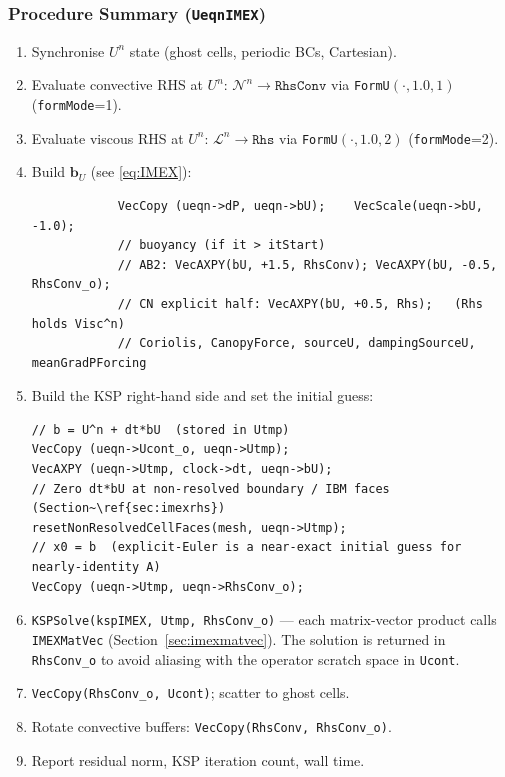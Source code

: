 \documentclass[12pt,a4paper]{article}
\newcommand{\cN}{\mathcal{N}}
\newcommand{\cL}{\mathcal{L}}
\begin{document}
	\subsubsection{Procedure Summary (\texttt{UeqnIMEX})}
	\label{sec:imexproc}
	
	\begin{enumerate}
		\item Synchronise $U^n$ state (ghost cells, periodic BCs, Cartesian).
		\item Evaluate convective RHS at $U^n$:
		$\cN^n \to \texttt{RhsConv}$
		via \texttt{FormU}$(\cdot, 1.0, 1)$ (\texttt{formMode}=1).
		\item Evaluate viscous RHS at $U^n$:
		$\cL^n \to \texttt{Rhs}$
		via \texttt{FormU}$(\cdot, 1.0, 2)$ (\texttt{formMode}=2).
		\item Build $\bm{b}_U$ (see \eqref{eq:IMEX}):
		\begin{lstlisting}
			VecCopy (ueqn->dP, ueqn->bU);    VecScale(ueqn->bU, -1.0);
			// buoyancy (if it > itStart)
			// AB2: VecAXPY(bU, +1.5, RhsConv); VecAXPY(bU, -0.5, RhsConv_o);
			// CN explicit half: VecAXPY(bU, +0.5, Rhs);   (Rhs holds Visc^n)
			// Coriolis, CanopyForce, sourceU, dampingSourceU, meanGradPForcing
		\end{lstlisting}
		\item Build the KSP right-hand side and set the initial guess:
		\begin{lstlisting}
// b = U^n + dt*bU  (stored in Utmp)
VecCopy (ueqn->Ucont_o, ueqn->Utmp);
VecAXPY (ueqn->Utmp, clock->dt, ueqn->bU);
// Zero dt*bU at non-resolved boundary / IBM faces (Section~\ref{sec:imexrhs})
resetNonResolvedCellFaces(mesh, ueqn->Utmp);
// x0 = b  (explicit-Euler is a near-exact initial guess for nearly-identity A)
VecCopy (ueqn->Utmp, ueqn->RhsConv_o);
		\end{lstlisting}
		\item \texttt{KSPSolve(kspIMEX, Utmp, RhsConv\_o)} --- each
		matrix-vector product calls \texttt{IMEXMatVec}
		(Section~\ref{sec:imexmatvec}).
		The solution is returned in \texttt{RhsConv\_o} to avoid aliasing
		with the operator scratch space in \texttt{Ucont}.
		\item \texttt{VecCopy(RhsConv\_o, Ucont)}; scatter to ghost cells.
		\item Rotate convective buffers: \texttt{VecCopy(RhsConv, RhsConv\_o)}.
		\item Report residual norm, KSP iteration count, wall time.
	\end{enumerate}
\end{document}
